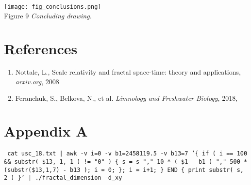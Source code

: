 \documentclass[a4paper]{article}
\begin{document}
\vskip 12pt

\texttt{[image: fig\_conclusions.png]}\\
Figure 9 \textit{Concluding drawing.}

\section*{References}

\begin{enumerate}

\item Nottale, L., Scale relativity and fractal space-time: theory and applications, \textit{arxiv.org}, 2008

\item Feranchuk, S., Belkova, N., et al. \textit{Limnology and Freshwater Biology}, 2018,

\end{enumerate}

\newpage
\section*{Appendix A}


\texttt{\small{ cat usc\_18.txt | awk -v i=0 -v b1=2458119.5 -v b13=7 '\{ if ( i == 100 \&\& substr( \$13, 1, 1 ) != "0" ) \{ s = s "," 10 * ( \$1 - b1 ) "," 500 * (substr(\$13,1,7) - b13 ); i = 0; \}; i = i+1; \} END \{ print substr( s, 2 ) \}' | ./fractal\_dimension -d\_xy }}



\end{document}
